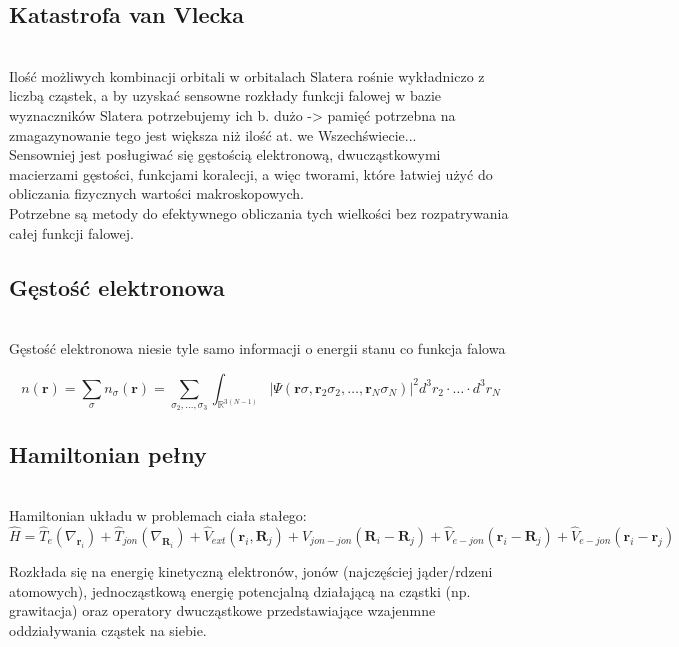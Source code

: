\subsection{Katastrofa van Vlecka}
~\\
Ilość możliwych kombinacji orbitali w orbitalach Slatera rośnie wykładniczo z liczbą cząstek, a by uzyskać sensowne rozkłady funkcji falowej w bazie wyznaczników Slatera potrzebujemy ich b. dużo -> pamięć potrzebna na zmagazynowanie tego jest większa niż ilość at. we Wszechświecie...\\
Sensowniej jest posługiwać się gęstością elektronową, dwucząstkowymi macierzami gęstości, funkcjami koralecji, a więc tworami, które łatwiej użyć do obliczania fizycznych wartości makroskopowych.\\
Potrzebne są metody do efektywnego obliczania tych wielkości bez rozpatrywania całej funkcji falowej.\\

\subsection{Gęstość elektronowa}
~\\
Gęstość elektronowa niesie tyle samo informacji o energii stanu co funkcja falowa

\begin{equation}
n\left(\boldsymbol{r}\right) = \sum_{\sigma} n_{\sigma}\left(\boldsymbol{r}\right) = \sum_{\sigma_2,\ldots,\sigma_3}\int_{\mathbb{R}^{3(N-1)}} \vert \Psi \left(\boldsymbol{r}\sigma,\boldsymbol{r}_2\sigma_2,\ldots,\boldsymbol{r}_N\sigma_N\right) \vert^2 d^3r_2 \cdot \ldots \cdot d^3r_N
\end{equation}

\subsection{Hamiltonian pełny}
~\\
Hamiltonian układu w problemach ciała stałego:
\[
\hat{H}=\hat{T}_{e}\left(\nabla_{\boldsymbol{r}_{i}}\right)+\hat{T}_{jon}\left(\nabla_{\boldsymbol{R}_{i}}\right)+\hat{V}_{ext}\left(\boldsymbol{r}_{i},\boldsymbol{R}_{j}\right)+\hat{V}_{jon-jon}\left(\boldsymbol{R}_{i}-\boldsymbol{R}_{j}\right)+\hat{V}_{e-jon}\left(\boldsymbol{r}_{i}-\boldsymbol{R}_{j}\right)+\hat{V}_{e-jon}\left(\boldsymbol{r}_{i}-\boldsymbol{r}_{j}\right)
\]



Rozkłada się na energię kinetyczną elektronów, jonów (najczęściej
jąder/rdzeni atomowych), jednocząstkową energię potencjalną działającą
na cząstki (np. grawitacja) oraz operatory dwucząstkowe przedstawiające
wzajenmne oddziaływania cząstek na siebie.

